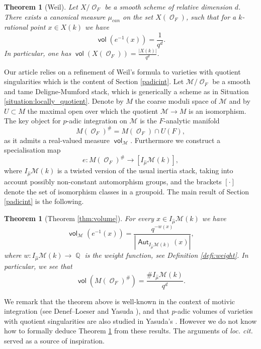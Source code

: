\documentclass{article}
\DeclareMathOperator{\Aut}{\mathsf{Aut}}
\newcommand{\Mc}{\mathcal{M}}
\DeclareMathOperator{\vol}{\mathsf{vol}}
\DeclareMathOperator{\Oo}{\mathcal{O}}
\DeclareMathOperator{\Qb}{\mathbb{Q}}
\theoremstyle{definition}
\theoremstyle{plain}
\newtheorem{theorem}[definition]{Theorem}
\begin{document}
\begin{theorem}[Weil] \label{weilthm}
Let $X/\Oo_F$ be a smooth scheme of relative dimension $d$. There exists a canonical measure $\mu_{can}$ on the set $X(\Oo_F)$, such that for a $k$-rational point $x \in X(k)$ we have
$$\vol(e^{-1}(x)) = \frac{1}{q^d}.$$
In particular, one has $\vol(X(\Oo_F)) = \frac{|X(k)|}{q^d}$.
\end{theorem}

Our article relies on a refinement of Weil's formula to varieties with quotient singularities which is the content of Section \ref{padicint}.
Let $\Mc / \Oo_F$ be a smooth and tame Deligne-Mumford stack, which is generically a scheme as in Situation \ref{situation:locally_quotient}. Denote by $M$ the coarse moduli space of $\Mc$ and by $U \subset M$ the maximal open over which the quotient $\Mc \to M$ is an isomorphism. The key object for $p$-adic integration on $\Mc$ is the $F$-analytic manifold 
\[M(\Oo_F)^\# = M(\Oo_F) \cap U(F),\]
as it admits a real-valued measure $\vol_{\Mc}$. Furthermore we construct a specialisation map
 \[e: M(\Oo_F)^\# \to [I_{\widehat{\mu}}\Mc(k)],  \]
where $I_{\widehat{\mu}}\Mc(k)$ is a twisted version of the usual inertia stack, taking into account possibly non-constant automorphism groups, and the brackets $[ \cdot ]$ denote the set of isomorphism classes in a groupoid. The main result of Section \ref{padicint} is the following.
\begin{theorem}[Theorem \ref{thm:volume}]\label{canmi} For every $x \in I_{\widehat{\mu}}\Mc(k)$ we have
\[ \vol_{\Mc}\left(e^{-1}(x)\right) =  \frac{q^{-w(x)}}{|\Aut_{I_{\widehat \mu}\Mc(k)}(x)|},   \]
where $w: I_{\widehat{\mu}}\Mc(k) \to \Qb$ is the \textit{weight function}, see Definition \ref{defi:weight}. In particular, we see that 
$$\vol\left(M(\Oo_F)^{\#}\right) = \frac{\#I_{\widehat{\mu}}\Mc(k)}{q^{d}}.$$
\end{theorem}

We remark that the theorem above is well-known in the context of motivic integration (see Denef--Loeser and Yasuda \cite{DL2002,Ya06}), and that $p$-adic volumes of varieties with quotient singularities are also studied in Yasuda's \cite{Yasuda:2014aa}. However we do not know how to formally deduce Theorem \ref{canmi} from these results. The arguments of \emph{loc. cit.} served as a source of inspiration.
\end{document}
